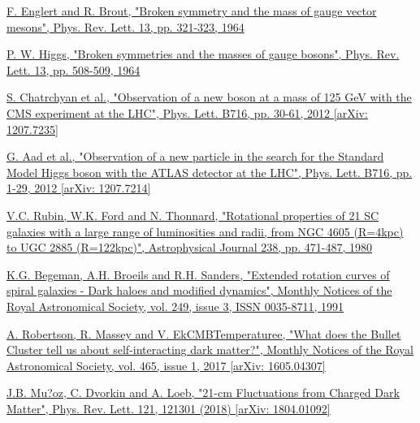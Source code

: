 \documentclass[a4paper, 10pt, openright]{report}
\begin{document}
\listoffigures 

\listoftables


\begin{thebibliography}{1}

\href{https://journals.aps.org/prl/abstract/10.1103/PhysRevLett.13.321}{F. Englert and R. Brout, 
"Broken symmetry and the mass of gauge vector mesons",
Phys. Rev. Lett. 13, pp. 321-323, 1964}

\href{https://journals.aps.org/prl/abstract/10.1103/PhysRevLett.13.508}{P. W. Higgs, 
"Broken symmetries and the masses of gauge bosons",
Phys. Rev. Lett. 13, pp. 508-509, 1964}

\href{https://arxiv.org/abs/1207.7235}{S. Chatrchyan et al.,
"Observation of a new boson at a mass of 125 GeV with the CMS experiment at the LHC",
Phys. Lett. B716, pp. 30-61, 2012 [arXiv: 1207.7235]
}

\href{https://arxiv.org/abs/1207.7214}{G. Aad et al.,
"Observation of a new particle in the search for the Standard Model Higgs boson with the ATLAS detector at the LHC", 
Phys. Lett. B716, pp. 1-29, 2012 [arXiv: 1207.7214]}

\href{https://ui.adsabs.harvard.edu/abs/1980ApJ...238..471R/abstract}{V.C. Rubin, W.K. Ford and N. Thonnard,
"Rotational properties of 21 SC galaxies with a large range of luminosities and radii, from NGC 4605 (R=4kpc) to UGC 2885 (R=122kpc)",
Astrophysical Journal 238, pp. 471-487, 1980}

\href{https://academic.oup.com/mnras/article/249/3/523/1005565}{K.G. Begeman, A.H. Broeils and R.H. Sanders,
"Extended rotation curves of spiral galaxies - Dark haloes and modified dynamics",
Monthly Notices of the Royal Astronomical Society, vol. 249, issue 3, ISSN 0035-8711, 1991}

\href{https://arxiv.org/abs/1605.04307}{A. Robertson, R. Massey and V. EkCMBTemperaturee,
"What does the Bullet Cluster tell us about self-interacting dark matter?",
Monthly Notices of the Royal Astronomical Society, vol. 465, issue 1, 2017 [arXiv: 1605.04307]}

\href{https://arxiv.org/abs/1804.01092}{J.B. Mu?oz, C. Dvorkin and A. Loeb,
"21-cm Fluctuations from Charged Dark Matter",
Phys. Rev. Lett. 121, 121301 (2018) [arXiv: 1804.01092]}


\end{thebibliography}
\end{document}
